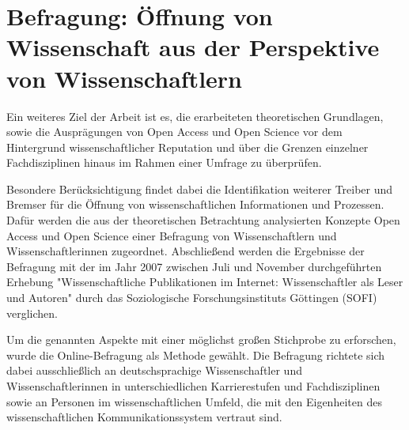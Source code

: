 \chapter{Befragung: Öffnung von Wissenschaft aus der Perspektive von Wissenschaftlern}

Ein weiteres Ziel der Arbeit ist es, die erarbeiteten theoretischen Grundlagen, sowie die Ausprägungen von Open Access und Open Science vor dem Hintergrund wissenschaftlicher Reputation und über die Grenzen einzelner Fachdisziplinen hinaus im Rahmen einer Umfrage zu überprüfen.

Besondere Berücksichtigung findet dabei die Identifikation weiterer Treiber und Bremser für die Öffnung von wissenschaftlichen Informationen und Prozessen. Dafür werden die aus der theoretischen Betrachtung analysierten Konzepte Open Access und Open Science einer Befragung von Wissenschaftlern und Wissenschaftlerinnen zugeordnet. Abschließend werden die Ergebnisse der Befragung mit der im Jahr 2007 zwischen Juli und November durchgeführten Erhebung "Wissenschaftliche Publikationen im Internet: Wissenschaftler als Leser und Autoren" durch das Soziologische Forschungsinstituts Göttingen (SOFI) verglichen.

Um die genannten Aspekte mit einer möglichst großen Stichprobe zu erforschen, wurde die Online-Befragung als Methode gewählt. Die Befragung richtete sich dabei ausschließlich an deutschsprachige Wissenschaftler und Wissenschaftlerinnen in unterschiedlichen Karrierestufen und Fachdisziplinen sowie an Personen im wissenschaftlichen Umfeld, die mit den Eigenheiten des wissenschaftlichen Kommunikationssystem vertraut sind.

